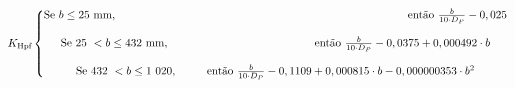 \begin{equation}
K_{\text{Hpf}}\left\{\begin{matrix} \text{Se}\ b\leq 25\ \text{mm},\ \ \ \ \ \ \ \ \ \ \ \ \ \ \ \ \ \ \ \ \ \ \ \ \ \ \ \ \ \ \ \ \ \ \ \ \ \ \ \ \ \ \ \ \ \ \ \ \ \ \ \ \ \ \ \ \ \ \ \ \ \ \ \ \ \ \ \ \ \ \ \ \ \ \ \ \ \ \text{então}\ \frac{b}{10\cdot D_{P}}-0,025\\\\\text{Se}\ 25\ <b\leq 432\ \text{mm},\ \ \ \ \ \ \ \ \ \ \ \ \ \ \ \ \ \ \ \ \ \ \ \ \ \ \ \ \ \ \ \ \ \ \ \ \ \ \ \text{então}\ \frac{b}{10\cdot D_{P}}-0,0375+0,000492\cdot b\\\\\text{Se}\ 432\ <b\leq 1\ 020,\ \ \ \ \ \ \ \ \text{então}\ \frac{b}{10\cdot D_{P}}-0,1109+0,000815\cdot b-0,000000353\cdot b^{2}\\
\end{matrix}\right.\ \nonumber \\
\end{equation}